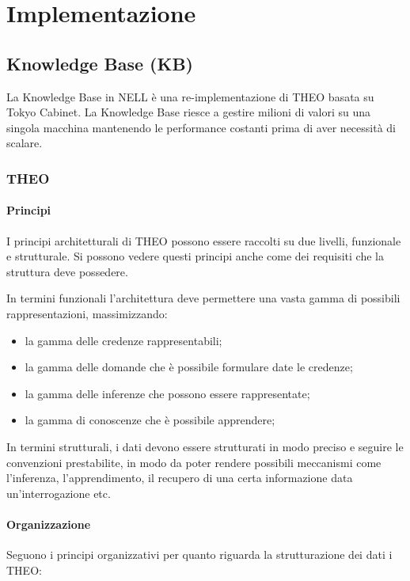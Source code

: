 \section{Implementazione}
\label{impl}
\subsection{Knowledge Base (KB)}
La Knowledge Base in NELL è una re-implementazione di THEO basata su Tokyo Cabinet. La Knowledge Base riesce a gestire milioni di valori su una singola macchina mantenendo le performance costanti prima di aver necessità di scalare\cite{TowardAnArchitecture:online}.
\subsubsection{THEO}
\paragraph{Principi}
I principi architetturali di THEO possono essere raccolti su due livelli, funzionale e strutturale. Si possono vedere questi principi anche come dei requisiti che la struttura deve possedere.

\noindent In termini funzionali l'architettura deve permettere una vasta gamma di possibili rappresentazioni, massimizzando:
\begin{itemize}
	\item la gamma delle credenze rappresentabili;
	\item la gamma delle domande che è possibile formulare date le credenze;
	\item la gamma delle inferenze che possono essere rappresentate;
	\item la gamma di conoscenze che è possibile apprendere;
\end{itemize}

In termini strutturali, i dati devono essere strutturati in modo preciso e seguire le convenzioni prestabilite, in modo da poter rendere possibili meccanismi come l'inferenza, l'apprendimento, il recupero di una certa informazione data un'interrogazione etc.

\paragraph{Organizzazione}
Seguono i principi organizzativi per quanto riguarda la strutturazione dei dati i THEO:

